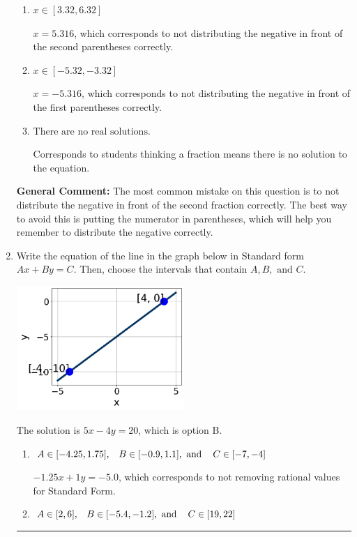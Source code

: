 \documentclass{extbook}[14pt]
\newcommand{\litem}[1]{\item #1

\rule{\textwidth}{0.4pt}}
\begin{document}
\begin{enumerate}
{\begin{enumerate}[label=\Alph*.]
$x = 16.833$, which corresponds to getting the negative of the actual solution.
\item \( x \in [3.32, 6.32] \)

$x = 5.316$, which corresponds to not distributing the negative in front of the second parentheses correctly.
\item \( x \in [-5.32, -3.32] \)

$x = -5.316$, which corresponds to not distributing the negative in front of the first parentheses correctly.
\item \( \text{There are no real solutions.} \)

Corresponds to students thinking a fraction means there is no solution to the equation.
\end{enumerate}

\textbf{General Comment:} The most common mistake on this question is to not distribute the negative in front of the second fraction correctly. The best way to avoid this is putting the numerator in parentheses, which will help you remember to distribute the negative correctly.
}
\litem{
Write the equation of the line in the graph below in Standard form $Ax+By=C$. Then, choose the intervals that contain $A, B, \text{ and } C$.

\begin{center}
    \includegraphics[width=0.5\textwidth]{../Figures/linearGraphToStandardC.png}
\end{center}



The solution is \( 5x - 4y = 20 \), which is option B.\begin{enumerate}[label=\Alph*.]
\item \( A \in [-4.25, 1.75], \hspace{3mm} B \in [-0.9, 1.1], \text{ and } \hspace{3mm} C \in [-7, -4] \)

 $-1.25x + 1y = -5.0$, which corresponds to not removing rational values for Standard Form.
\item \( A \in [2, 6], \hspace{3mm} B \in [-5.4, -1.2], \text{ and } \hspace{3mm} C \in [19, 22] \)


\end{enumerate}}
\end{enumerate}
\end{document}
